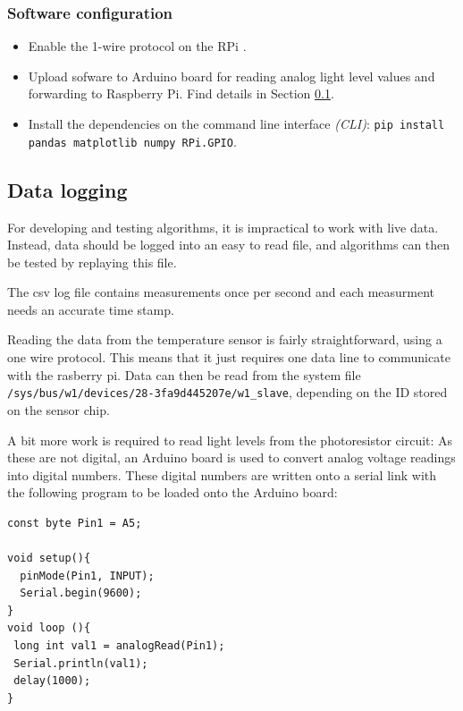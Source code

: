 \documentclass[a4paper,12pt]{article}
\begin{document}
\subsubsection{Software configuration}

\begin{itemize}
    \item Enable the 1-wire protocol on the RPi \cite{url:1wire}.
    \item Upload sofware to Arduino board for reading analog light level values and forwarding to Raspberry Pi. Find details in Section \ref{sec:datalogging}.
    \item Install the dependencies on the command line interface \emph{(CLI)}: \newline \verb|pip install pandas matplotlib numpy RPi.GPIO|.
\end{itemize}

\subsection{Data logging}
\label{sec:datalogging}

For developing and testing algorithms, it is impractical to work with live data. 
Instead, data should be logged into an easy to read file, and algorithms can then be tested by replaying this file.

The csv log file contains measurements once per second and each measurment needs an accurate time stamp.

Reading the data from the temperature sensor is fairly straightforward, using a one wire protocol\cite{url:digitalTempSensor}. 
This means that it just requires one data line to communicate with the rasberry pi.
Data can then be read from the system file \verb*|/sys/bus/w1/devices/28-3fa9d445207e/w1_slave|, depending on the ID stored on the sensor chip.

A bit more work is required to read light levels from the photoresistor circuit: As these are not digital, an Arduino board is used to convert analog
voltage readings into digital numbers. These digital numbers are written onto a serial link with the following program to be loaded onto the
Arduino board: 

\begin{lstlisting}
const byte Pin1 = A5;

void setup(){
  pinMode(Pin1, INPUT);
  Serial.begin(9600);
}
void loop (){
 long int val1 = analogRead(Pin1);
 Serial.println(val1);
 delay(1000);
}

\end{lstlisting}
\end{document}
